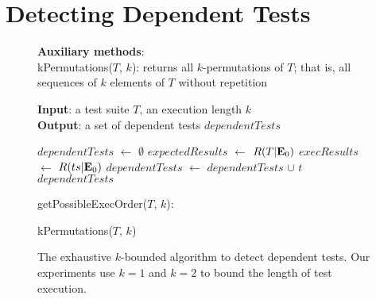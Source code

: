 \section{Detecting Dependent Tests}
\label{sec:detecting}

\newcommand{\testlist}[0]{\ensuremath{T^k_i}}
\newcommand{\executeTestsInOrder}[1]{\result{#1}{\env_0}}

\begin{figure}[t]
\textbf{Auxiliary methods}:\\
kPermutations($T$, $k$): returns all $k$-permutations of $T$; that is, all
sequences of $k$ elements of $T$ without repetition

\medskip

\textbf{Input}: a test suite $\mathit{T}$, an execution length $\mathit{k}$\\
\textbf{Output}: a set of dependent tests $\mathit{dependentTests}$\\
\vspace{-5mm}
\begin{algorithmic}[1]
\STATE $\mathit{dependentTests}$ $\leftarrow$ $\emptyset$
\STATE $\mathit{expectedResults}$ $\leftarrow$ $R(T|\mathbf{E}_0)$
\STATE $\mathit{execResults}$ $\leftarrow$ $R(ts|\mathbf{E}_0)$
\STATE $\mathit{dependentTests}$ $\leftarrow$ $\mathit{dependentTests}$ $\cup$ $\mathit{t}$
\ENDIF
\ENDFOR
\ENDFOR
\RETURN $\mathit{dependentTests}$
\end{algorithmic}


\medskip

getPossibleExecOrder($T$, $k$):\\
\vspace{-5mm}
\begin{algorithmic}[1]
\RETURN kPermutations($T$, $k$)
\end{algorithmic}

\vspace{-3mm}
\caption {The exhaustive $k$-bounded algorithm to detect dependent tests.
Our experiments use $k=1$ and $k=2$ to bound the length of
test execution. } 
\label{fig:dtalgorithm}
\end{figure}

